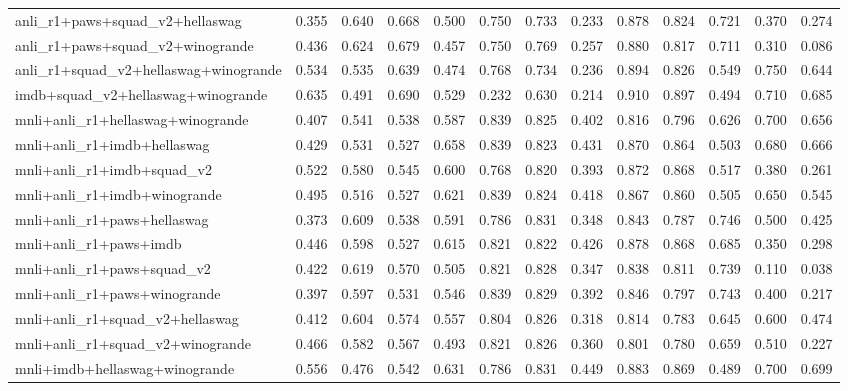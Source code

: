 \begin{table}[t]
\begin{tabular}{lrrrrrrrrrrrr}
    anli\_r1+paws+squad\_v2+hellaswag & 0.355 & 0.640 & 0.668 & 0.500 & 0.750 & 0.733 & 0.233 & 0.878 & 0.824 & 0.721 & 0.370 & 0.274 \\
    anli\_r1+paws+squad\_v2+winogrande & 0.436 & 0.624 & 0.679 & 0.457 & 0.750 & 0.769 & 0.257 & 0.880 & 0.817 & 0.711 & 0.310 & 0.086 \\
    anli\_r1+squad\_v2+hellaswag+winogrande & 0.534 & 0.535 & 0.639 & 0.474 & 0.768 & 0.734 & 0.236 & 0.894 & 0.826 & 0.549 & 0.750 & 0.644 \\
    imdb+squad\_v2+hellaswag+winogrande & 0.635 & 0.491 & 0.690 & 0.529 & 0.232 & 0.630 & 0.214 & 0.910 & 0.897 & 0.494 & 0.710 & 0.685 \\
    mnli+anli\_r1+hellaswag+winogrande & 0.407 & 0.541 & 0.538 & 0.587 & 0.839 & 0.825 & 0.402 & 0.816 & 0.796 & 0.626 & 0.700 & 0.656 \\
    mnli+anli\_r1+imdb+hellaswag & 0.429 & 0.531 & 0.527 & 0.658 & 0.839 & 0.823 & 0.431 & 0.870 & 0.864 & 0.503 & 0.680 & 0.666 \\
    mnli+anli\_r1+imdb+squad\_v2 & 0.522 & 0.580 & 0.545 & 0.600 & 0.768 & 0.820 & 0.393 & 0.872 & 0.868 & 0.517 & 0.380 & 0.261 \\
    mnli+anli\_r1+imdb+winogrande & 0.495 & 0.516 & 0.527 & 0.621 & 0.839 & 0.824 & 0.418 & 0.867 & 0.860 & 0.505 & 0.650 & 0.545 \\
    mnli+anli\_r1+paws+hellaswag & 0.373 & 0.609 & 0.538 & 0.591 & 0.786 & 0.831 & 0.348 & 0.843 & 0.787 & 0.746 & 0.500 & 0.425 \\
    mnli+anli\_r1+paws+imdb & 0.446 & 0.598 & 0.527 & 0.615 & 0.821 & 0.822 & 0.426 & 0.878 & 0.868 & 0.685 & 0.350 & 0.298 \\
    mnli+anli\_r1+paws+squad\_v2 & 0.422 & 0.619 & 0.570 & 0.505 & 0.821 & 0.828 & 0.347 & 0.838 & 0.811 & 0.739 & 0.110 & 0.038 \\
    mnli+anli\_r1+paws+winogrande & 0.397 & 0.597 & 0.531 & 0.546 & 0.839 & 0.829 & 0.392 & 0.846 & 0.797 & 0.743 & 0.400 & 0.217 \\
    mnli+anli\_r1+squad\_v2+hellaswag & 0.412 & 0.604 & 0.574 & 0.557 & 0.804 & 0.826 & 0.318 & 0.814 & 0.783 & 0.645 & 0.600 & 0.474 \\
    mnli+anli\_r1+squad\_v2+winogrande & 0.466 & 0.582 & 0.567 & 0.493 & 0.821 & 0.826 & 0.360 & 0.801 & 0.780 & 0.659 & 0.510 & 0.227 \\
    mnli+imdb+hellaswag+winogrande & 0.556 & 0.476 & 0.542 & 0.631 & 0.786 & 0.831 & 0.449 & 0.883 & 0.869 & 0.489 & 0.700 & 0.699 \\

\end{tabular}
\end{table}
